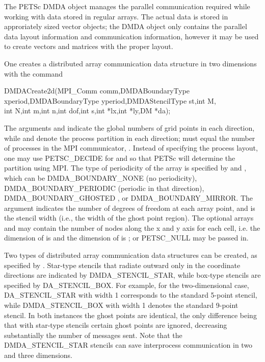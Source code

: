 The PETSc DMDA object manages the parallel communication required
while working with data stored in regular arrays. The actual data
is stored in approriately sized vector objects; the DMDA object
only contains the parallel data layout information and communication
information, however it may be used to create vectors and matrices with the
proper layout.

One creates a distributed array communication data structure
in two dimensions with the command
\begin{tabbing}
  DMDACreate2d(MPI\_Comm comm,DMDABoundaryType xperiod,DMDABoundaryType yperiod,DMDAStencilType st,int M,\\
             int N,int m,int n,int dof,int s,int *lx,int *ly,DM *da);
\end{tabbing}
The   arguments
  and  indicate the global
numbers of grid points in each direction, while  and 
denote the process partition in each direction;  must equal
the number of processes in the MPI communicator, .
Instead of specifying the process layout, one may use
PETSC\_DECIDE for  and 
so that PETSc will determine the partition using MPI. The type of
periodicity of the array is specified by  and , which can be
DMDA\_BOUNDARY\_NONE  (no periodicity),
DMDA\_BOUNDARY\_PERIODIC  (periodic in that direction),
DMDA\_BOUNDARY\_GHOSTED ,
or DMDA\_BOUNDARY\_MIRROR.  The argument 
indicates the number of degrees of freedom at each array point,
and  is the stencil width (i.e., the width of the ghost point region).
The optional arrays  and  may contain the number of nodes
along the x and y axis for each cell, i.e. the dimension of  is
 and the dimension of  is ; or PETSC\_NULL
may be passed in.

Two types of distributed array communication data structures
can be created, as specified by .
Star-type stencils that radiate outward only in the coordinate
directions are indicated by DMDA\_STENCIL\_STAR,
while box-type stencils are specified by
DA\_STENCIL\_BOX. For example, for the
two-dimensional case,
DA\_STENCIL\_STAR with width 1 corresponds to the standard 5-point
stencil, while DMDA\_STENCIL\_BOX with width 1 denotes the
standard 9-point stencil.  In both instances the ghost points are
identical, the only difference being that with star-type stencils
certain ghost points are ignored, decreasing substantially
the number of messages sent.  Note that the DMDA\_STENCIL\_STAR
stencils can save interprocess communication in two and three
dimensions.

